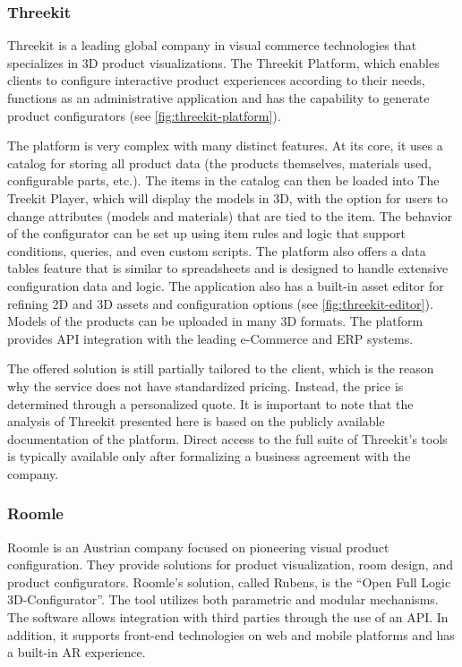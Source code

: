 \subsubsection{Threekit}

Threekit is a leading global company in visual commerce technologies that specializes in 3D product visualizations. The Threekit Platform, which enables clients to configure interactive product experiences according to their needs, functions as an administrative application and has the capability to generate product configurators (see \autoref{fig:threekit-platform}). \cite{ThreeKitAboutUs} \cite{ThreeKitPlatform}

The platform is very complex with many distinct features. At its core, it uses a catalog for storing all product data (the products themselves, materials used, configurable parts, etc.). The items in the catalog can then be loaded into The Treekit Player, which will display the models in 3D, with the option for users to change attributes (models and materials) that are tied to the item. The behavior of the configurator can be set up using item rules and logic that support conditions, queries, and even custom scripts. The platform also offers a data tables feature that is similar to spreadsheets and is designed to handle extensive configuration data and logic. The application also has a built-in asset editor for refining 2D and 3D assets and configuration options (see \autoref{fig:threekit-editor}). Models of the products can be uploaded in many 3D formats. The platform provides API integration with the leading e-Commerce and ERP systems. \cite{ThreeKitPlatformDocumentation}

The offered solution is still partially tailored to the client, which is the reason why the service does not have standardized pricing. Instead, the price is determined through a personalized quote. It is important to note that the analysis of Threekit presented here is based on the publicly available documentation of the platform. Direct access to the full suite of Threekit's tools is typically available only after formalizing a business agreement with the company.


\subsubsection{Roomle}

Roomle is an Austrian company focused on pioneering visual product configuration. They provide solutions for product visualization, room design, and product configurators. Roomle's solution, called Rubens, is the \enquote{Open Full Logic 3D-Configurator}. The tool utilizes both parametric and modular mechanisms. The software allows integration with third parties through the use of an API. In addition, it supports front-end technologies on web and mobile platforms and has a built-in AR experience. \cite{RoomleAbout}

